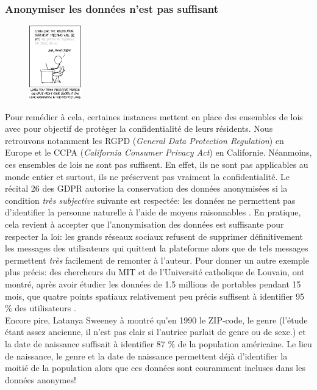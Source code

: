 \subsubsection{Anonymiser les données n'est pas suffisant}


\begin{figure}
    \centering
    \includegraphics[width=0.20\textwidth, clip]{"./proofs/figures/predictive_models.png"}
\end{figure}


Pour remédier à cela, certaines instances mettent en place des ensembles de lois avec pour objectif de protéger la confidentialité de leurs résidents. Nous retrouvons notamment les RGPD (\textit{General Data Protection Regulation}) en Europe et le CCPA (\textit{California Consumer Privacy Act}) en Californie. Néanmoins, ces ensembles de lois ne sont pas suffisent. En effet, ils ne sont pas applicables au monde entier et surtout, ils ne préservent pas vraiment la confidentialité. Le récital 26 des GDPR autorise la conservation des données anonymisées si la condition \textit{très subjective} suivante est respectée: les données ne permettent pas d'identifier la personne naturelle à l'aide de moyens raisonnables \cite{rec26}. En pratique, cela revient à accepter que l'anonymisation des données est suffisante pour respecter la loi: les grands réseaux sociaux refusent de supprimer définitivement les messages des utilisateurs qui quittent la plateforme alors que de tels messages permettent \textit{très} facilement de remonter à l'auteur. Pour donner un autre exemple plus précis: des chercheurs du MIT et de l'Université catholique de Louvain, ont montré, après avoir étudier les données de 1.5 millions de portables pendant 15 mois, que quatre points spatiaux relativement peu précis suffisent à identifier 95 \% des utilisateurs \cite{cell}.\\

Encore pire, {\sc Latanya Sweeney} à montré \cite{link} qu'en 1990 le ZIP-code, le genre (l'étude étant assez ancienne, il n'est pas clair si l'autrice parlait de genre ou de sexe.) et la date de naissance suffisait à identifier 87 \% de la population américaine. Le lieu de naissance, le genre et la date de naissance permettent déjà d'identifier la moitié de la population alors que ces données sont couramment incluses dans les données anonymes!


